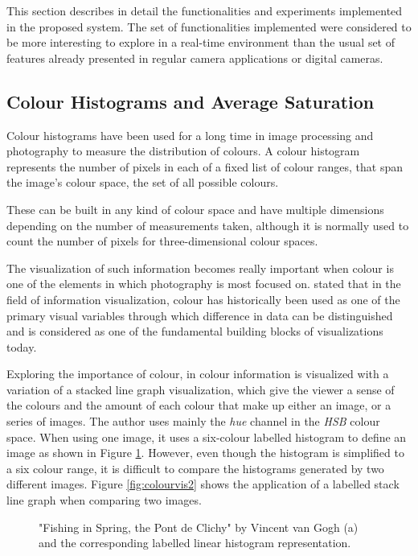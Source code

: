 This section describes in detail the functionalities and experiments implemented in the proposed system. The set of functionalities implemented were considered to be more interesting to explore in a real-time environment than the usual set of features already presented in regular camera applications or digital cameras.

\subsection{Colour Histograms and Average Saturation}
\label{sub:histograms}

Colour histograms have been used for a long time in image processing and photography to measure the distribution of colours. A colour histogram represents the number of pixels in each of a fixed list of colour ranges, that span the image's colour space, the set of all possible colours.

These can be built in any kind of colour space and have multiple dimensions depending on the number of measurements taken, although it is normally used to count the number of pixels for three-dimensional colour spaces.

The visualization of such information becomes really important when colour is one of the elements in which photography is most focused on. \citeauthor{bertin1983semiology} stated that in the field of information visualization, colour has historically been used as one of the primary visual variables through which difference in data can be distinguished and is considered as one of the fundamental building blocks of visualizations today.

Exploring the importance of colour, in \cite{haber2011colourvis} colour information is visualized with a variation of a stacked line graph visualization, which give the viewer a sense of the colours and the amount of each colour that make up either an image, or a series of images. The author uses mainly the \emph{hue} channel in the \emph{HSB} colour space. When using one image, it uses a six-colour labelled histogram to define an image as shown in Figure \ref{fig:colourvis1}. However, even though the histogram is simplified to a six colour range, it is difficult to compare the histograms generated by two different images. Figure \ref{fig:colourvis2} shows the application of a labelled stack line graph when comparing two images.

\begin{figure}[htbp]
	\centering
  \caption{"Fishing in Spring, the Pont de Clichy" by Vincent van Gogh (a) and the corresponding labelled linear histogram representation.}
  \label{fig:colourvis1}
\end{figure}



